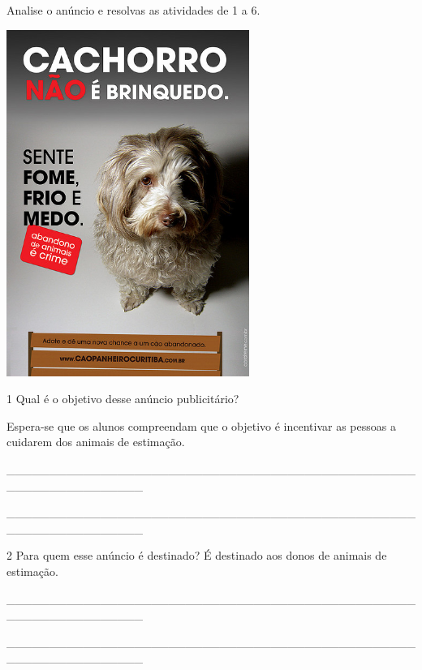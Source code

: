 Analise o anúncio e resolvas as atividades de 1 a 6.



\includegraphics[width=3.11354in,height=4.44792in]{media/image9.jpeg}

\num{1} Qual é o objetivo desse anúncio publicitário?

Espera-se que os alunos compreendam que o objetivo é incentivar as
pessoas a cuidarem dos animais de estimação.

\_\_\_\_\_\_\_\_\_\_\_\_\_\_\_\_\_\_\_\_\_\_\_\_\_\_\_\_\_\_\_\_\_\_\_\_\_\_\_\_\_\_\_\_\_\_\_\_\_\_\_\_\_\_\_\_\_\_\_\_\_\_\_\_

\_\_\_\_\_\_\_\_\_\_\_\_\_\_\_\_\_\_\_\_\_\_\_\_\_\_\_\_\_\_\_\_\_\_\_\_\_\_\_\_\_\_\_\_\_\_\_\_\_\_\_\_\_\_\_\_\_\_\_\_\_\_\_\_

\num{2} Para quem esse anúncio é destinado? É destinado aos donos de animais
de estimação.

\_\_\_\_\_\_\_\_\_\_\_\_\_\_\_\_\_\_\_\_\_\_\_\_\_\_\_\_\_\_\_\_\_\_\_\_\_\_\_\_\_\_\_\_\_\_\_\_\_\_\_\_\_\_\_\_\_\_\_\_\_\_\_\_

\_\_\_\_\_\_\_\_\_\_\_\_\_\_\_\_\_\_\_\_\_\_\_\_\_\_\_\_\_\_\_\_\_\_\_\_\_\_\_\_\_\_\_\_\_\_\_\_\_\_\_\_\_\_\_\_\_\_\_\_\_\_\_\_

